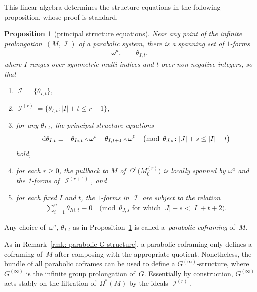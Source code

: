 \documentclass[pdftex]{sigma}
\DeclareMathOperator{\I}{\mathcal{I}}
\renewcommand{\d}{{\rm d}}
\renewcommand{\mod}[1]{\quad\big(\mathrm{mod\enspace} #1\big)}
\newcommand{\w}{{\mathchoice{\,{\scriptstyle\wedge}\,}{{\scriptstyle\wedge}}
 {{\scriptscriptstyle\wedge}}{{\scriptscriptstyle\wedge}}}}
\newcommand{\M}[1]{M_0^{(#1)}}
\newcommand{\thetas}[1]{\theta_{#1}}
\numberwithin{equation}{section}
\newtheorem{Proposition}[Theorem]{Proposition}
{ \theoremstyle{definition}
\newtheorem{Definition}[Theorem]{Definition}
\newtheorem{Example}[Theorem]{Example}
\newtheorem{Remark}[Theorem]{Remark} }
\begin{document}
This linear algebra determines the structure equations in the following proposition, whose proof is standard.
\begin{Proposition}[principal structure equations]\label{thm:principal structure equations}
 Near any point of the infinite prolonga\-tion~$(M, \I)$ of a parabolic system, there is a spanning set of $1$-forms
 \begin{gather*}
 \omega^a, \qquad \thetas{I,t} ,
 \end{gather*}
 where $I$ ranges over symmetric multi-indices and $t$ over non-negative integers, so that
 \begin{enumerate}\itemsep=0pt
 \item[$1.$] $\I = \{\thetas{I,t}\}$,

 \item[$2.$] $\I^{(r)} = \{\thetas{I,t} \colon |I| + t \le r + 1\}$,

 \item[$3.$] for any $\thetas{I,t}$,
 the principal structure equations
 \begin{gather}\label{eq:principal structure equations}
 \d\thetas{I,t} \equiv - \thetas{Ii,t}\w\omega^i - \thetas{I,t+1}\w\omega^0 \mod{\thetas{J,s} \colon |J| + s \le |I| + t}
 \end{gather}
 hold,

 \item[$4.$] for each $r\ge 0$, the pullback to $M$ of~$\Omega^1\big(\M{r}\big)$ is locally spanned by $\omega^a$ and the 1-forms of~$\I^{(r+1)}$, and

 \item[$5.$] for each fixed $I$ and $t$, the $ 1 $-forms in $\I$ are subject to the relation
 \begin{gather*}
 \sum_{i=1}^n \thetas{Iii,t} \equiv 0 \mod{\thetas{J,s} \mbox{ for which } |J| + s < |I| + t + 2} .
 \end{gather*}
 \end{enumerate}
\end{Proposition}

\begin{Definition}
 Any choice of~$\omega^a$, $\thetas{I,t}$ as in Proposition~\ref{thm:principal structure equations} is called a~\emph{parabolic coframing} of~$M$.
\end{Definition}

\begin{Remark}\label{rmk: infinitely prolonged parabolic G structure}
 As in Remark~\ref{rmk: parabolic G structure}, a parabolic coframing only defines a coframing of~$M$ after composing with the appropriate quotient. Nonetheless, the bundle of all parabolic coframes can be used to define a $G^{(\infty)}$-structure, where $G^{(\infty)}$ is the infinite group prolongation of~$G$. Essentially by construction, $G^{(\infty)}$ acts stably on the filtration of~$\Omega^*(M)$ by the ideals $\I^{(r)}$.
\end{Remark}
\end{document}
